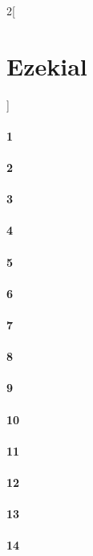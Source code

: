 \documentclass{book}
\begin{document}
\begin{multicols}{2}[\part{Ezekial}]
\subsection*{1}
\subsection*{2}
\subsection*{3}
\subsection*{4}
\subsection*{5}
\subsection*{6}
\subsection*{7}
\subsection*{8}
\subsection*{9}
\subsection*{10}
\subsection*{11}
\subsection*{12}
\subsection*{13}
\subsection*{14}

\end{multicols}
\end{document}
